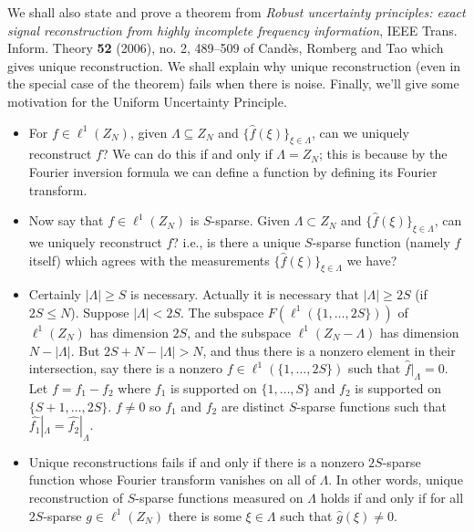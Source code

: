 \documentclass{slides}
\begin{document}
\begin{slide}
We shall also state and prove a theorem from {\em Robust uncertainty principles: exact signal reconstruction from highly incomplete frequency information},
IEEE Trans. Inform. Theory \textbf{52} (2006), no. 2, 489--509
of Cand\`es, Romberg and Tao which gives unique reconstruction.
We shall explain why unique reconstruction (even in the special case of
the theorem) fails when there is noise.
Finally, we'll give some motivation for the Uniform Uncertainty
Principle.
\end{slide}

\begin{slide}
\begin{itemize}
\item For $f \in \ell^1(Z_N)$, given $\Lambda \subseteq Z_N$
and $\{\hat{f}(\xi)\}_{\xi \in \Lambda}$,
can we uniquely reconstruct $f$? We can do this if and only if
$\Lambda=Z_N$; this is because by the Fourier inversion formula
we can define a function by defining its Fourier transform.

\item Now say that $f \in \ell^1(Z_N)$ is $S$-sparse. Given 
$\Lambda \subset Z_N$ and $\{\hat{f}(\xi)\}_{\xi \in \Lambda}$,
can we uniquely reconstruct $f$? i.e., is there a unique $S$-sparse
function (namely $f$ itself) which agrees with the measurements
$\{\hat{f}(\xi)\}_{\xi \in \Lambda}$ we have?
\end{itemize}
\end{slide}

\begin{slide}
\begin{itemize}
\item Certainly $|\Lambda| \geq S$ is necessary. Actually
it is necessary that $|\Lambda|\geq 2S$ (if $2S \leq N$).
Suppose $|\Lambda|<2S$.
The subspace $F(\ell^1(\{1,\ldots,2S\}))$ of $\ell^1(Z_N)$
has dimension $2S$, and the subspace $\ell^1(Z_N-\Lambda)$ has
dimension $N-|\Lambda|$. 
But $2S+N-|\Lambda|>N$, and thus there is a nonzero
element in their intersection, say there is a nonzero $f \in \ell^1(\{1,\ldots,2S\})$ such that $\hat{f}|_{\Lambda}=0$.
Let $f=f_1-f_2$ where $f_1$ is supported on $\{1,\ldots,S\}$ and
$f_2$ is supported on $\{S+1,\ldots,2S\}$. $f \neq 0$ so $f_1$ and $f_2$
are distinct $S$-sparse functions such that $\hat{f_1}|_{\Lambda}
=\hat{f_2}|_{\Lambda}$.

\item Unique reconstructions fails if and only if there is a nonzero
$2S$-sparse function whose Fourier transform vanishes on all of $\Lambda$.
In other words,
unique reconstruction of $S$-sparse functions measured
on $\Lambda$ holds if and only if for all $2S$-sparse $g \in \ell^1(Z_N)$
there is some $\xi \in \Lambda$ such that $\hat{g}(\xi) \neq 0$.
\end{itemize}
\end{slide}
\end{document}
